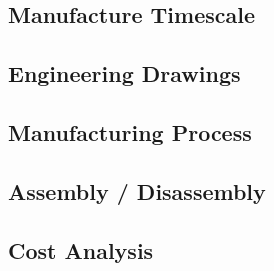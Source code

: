 \subsection{Manufacture Timescale}
\label{sub:manufacture_timescale}


\subsection{Engineering Drawings}
\label{sub:engineering_drawings}


\subsection{Manufacturing Process}
\label{sub:manufacturing_process}


\subsection{Assembly / Disassembly}
\label{sub:assembly_disassembly}


\subsection{Cost Analysis}
\label{sub:cost_analysis}

